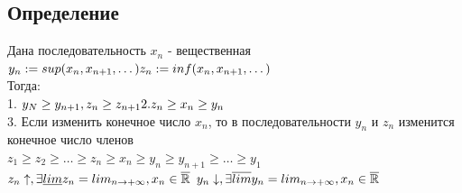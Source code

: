 \documentclass[12pt, a4paper]{article}
\newcommand{\nl}{\newline}
\begin{document}
	\subsection{Определение}
	Дана последовательность $ x_n $ - вещественная \nl
	$ y_n:= sup(x_n,x_{n+1},\dots) \\
	z_n:= inf(x_n,x_{n+1},\dots) $\\
	Тогда: \\
	1. $ y_N \geq y_{n+1} , z_n \geq z_{n+1} \\
	2. z_n \geq x_n \geq y_n $\\
	3. Если изменить конечное число $ x_n $, то в последовательности $ y_n $ и $ z_n $ изменится конечное число членов\nl \\
	$z_1 \geq z_2 \geq \dots \geq z_n \geq x_n \geq y_n \geq y_{n+1} \geq \dots \geq y_1$ \\
	$ z_n\uparrow, \exists \underline{lim} z_n = lim_{n\rightarrow+\infty} , x_n \in \overline{\mathbb{R}} \\$
	$ y_n\downarrow, \exists \overline{lim} y_n = lim_{n\rightarrow+\infty} , x_n \in \overline{\mathbb{R}} \\$
\end{document}
